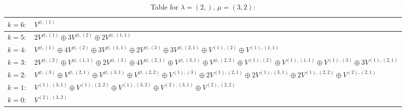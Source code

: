 \documentclass[a4paper,12pt]{article}
\begin{document}
\renewcommand{\arraystretch}{1.6} 
\begin{table}[H]
\centering
\caption{Table for $\lambda = (2,)$, $\mu = (3, 2)$:}
\begin{tabular}{|>{\centering\arraybackslash}p{15cm}|}
\hline
 $k = 6: \quad V^{\varnothing, (1)} $ \\ \hline
 $k = 5: \quad 2 V^{\varnothing, (1)} \oplus 3 V^{\varnothing, (2)} \oplus 2 V^{\varnothing, (1, 1)} $ \\ \hline
 $k = 4: \quad V^{\varnothing, (1)} \oplus 4 V^{\varnothing, (2)} \oplus 3 V^{\varnothing, (1, 1)} \oplus 2 V^{\varnothing, (3)} \oplus 3 V^{\varnothing, (2, 1)} \oplus V^{(1), (2)} \oplus V^{(1), (1, 1)} $ \\ \hline
 $k = 3: \quad 2 V^{\varnothing, (2)} \oplus V^{\varnothing, (1, 1)} \oplus 2 V^{\varnothing, (3)} \oplus 4 V^{\varnothing, (2, 1)} \oplus V^{\varnothing, (3, 1)} \oplus V^{\varnothing, (2, 2)} \oplus V^{(1), (2)} \oplus V^{(1), (1, 1)} \oplus V^{(1), (3)} \oplus 3 V^{(1), (2, 1)} $ \\ \hline
 $k = 2: \quad V^{\varnothing, (3)} \oplus V^{\varnothing, (2, 1)} \oplus V^{\varnothing, (3, 1)} \oplus V^{\varnothing, (2, 2)} \oplus V^{(1), (3)} \oplus 2 V^{(1), (2, 1)} \oplus 2 V^{(1), (3, 1)} \oplus 2 V^{(1), (2, 2)} \oplus V^{(2), (2, 1)} $ \\ \hline
 $k = 1: \quad V^{(1), (3, 1)} \oplus V^{(1), (2, 2)} \oplus V^{(1), (3, 2)} \oplus V^{(2), (3, 1)} \oplus V^{(2), (2, 2)} $ \\ \hline
 $k = 0: \quad V^{(2), (3, 2)} $ \\ \hline
\end{tabular}
\end{table}
\end{document}
